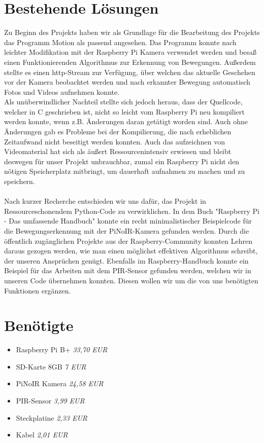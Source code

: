 \documentclass[9pt,a4paper]{IEEEtran}
\begin{document}
\section{Bestehende Lösungen} 
Zu Beginn des Projekts haben wir als Grundlage für die Bearbeitung des Projekts das Programm Motion\cite{motion} als passend angesehen. 
Das Programm konnte nach leichter Modifikation mit der Raspberry Pi Kamera verwendet werden und besaß einen Funktionierenden Algorithmus zur Erkennung von Bewegungen. 
Außerdem stellte es einen http-Stream zur Verfügung, über welchen das aktuelle Geschehen vor der Kamera beobachtet werden und nach erkannter Bewegung automatisch Fotos und Videos aufnehmen konnte. 
\\ 
Als unüberwindlicher Nachteil stellte sich jedoch heraus, dass der Quellcode, welcher in C geschrieben ist, nicht so leicht vom Raspberry Pi neu kompiliert werden konnte, wenn z.B. Änderungen daran getätigt worden sind. 
Auch ohne Änderungen gab es Probleme bei der Kompilierung, die nach erheblichen Zeitaufwand nicht beseitigt werden konnten. 
Auch das aufzeichnen von Videomaterial hat sich als äußert Ressourcenintensiv erwiesen und bleibt deswegen für unser Projekt unbrauchbar, zumal ein Raspberry Pi nicht den nötigen Speicherplatz mitbringt, um dauerhaft aufnahmen zu machen und zu speichern.
\\ \\
Nach kurzer Recherche entschieden wir uns dafür, das Projekt in Ressourceschonendem Python-Code zu verwirklichen.
In dem Buch "Raspberry Pi - Das umfassende Handbuch" konnte ein recht minimalistischer Beispielcode für die Bewegungserkennung mit der PiNoIR-Kamera gefunden werden\cite[S. XXX]{Raspi}.  
Durch die öffentlich zugänglichen Projekte aus der Raspberry-Community konnten Lehren daraus gezogen werden, wie man einen möglichst effektiven Algorithmus schreibt, der unseren Ansprüchen genügt. 
Ebenfalls im Raspberry-Handbuch konnte ein Beispiel für das Arbeiten mit dem PIR-Sensor gefunden werden\cite[S. 495]{Raspi}, welchen wir in unseren Code übernehmen konnten.
Diesen wollen wir um die von uns benötigten Funktionen ergänzen.


\section{Benötigte}
\begin{itemize}
\item Raspberry Pi B+ \textit{33,70 EUR} 
\item SD-Karte 8GB \textit{7 EUR}
\item PiNoIR Kamera \textit{24,58 EUR}
\item PIR-Sensor \textit{3,99 EUR}
\item Steckplatine \textit{2,33 EUR}
\item Kabel \textit{2,01 EUR}
\end{itemize}
\end{document}
